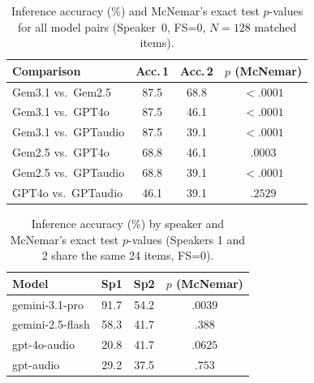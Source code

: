 \begin{table}[t]
\centering
\small
\begin{tabular}{lccc}
\toprule
\textbf{Comparison} & \textbf{Acc.\,1} & \textbf{Acc.\,2} & \textbf{$p$ (McNemar)} \\
\midrule
Gem3.1 vs.\ Gem2.5   & 87.5 & 68.8 & $<.0001$ \\
Gem3.1 vs.\ GPT4o    & 87.5 & 46.1 & $<.0001$ \\
Gem3.1 vs.\ GPTaudio & 87.5 & 39.1 & $<.0001$ \\
Gem2.5 vs.\ GPT4o    & 68.8 & 46.1 & $.0003$  \\
Gem2.5 vs.\ GPTaudio & 68.8 & 39.1 & $<.0001$ \\
GPT4o vs.\ GPTaudio  & 46.1 & 39.1 & $.2529$  \\
\bottomrule
\end{tabular}
\caption{Inference accuracy (\%) and McNemar's exact test $p$-values for all
model pairs (Speaker~0, FS=0, $N=128$ matched items).}
\label{tab:mcnemar}
\end{table}


\begin{table}[t]
\centering
\small
\begin{tabular}{lccc}
\toprule
\textbf{Model} & \textbf{Sp1} & \textbf{Sp2} & \textbf{$p$ (McNemar)} \\
\midrule
gemini-3.1-pro & 91.7 & 54.2 & $.0039$ \\
gemini-2.5-flash & 58.3 & 41.7 & $.388$ \\
gpt-4o-audio & 20.8 & 41.7 & $.0625$ \\
gpt-audio & 29.2 & 37.5 & $.753$ \\
\bottomrule
\end{tabular}
\caption{Inference accuracy (\%) by speaker and McNemar's exact test
$p$-values (Speakers 1 and 2 share the same 24 items, FS=0).}
\label{tab:speaker-mcnemar}
\end{table}


